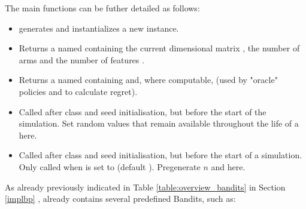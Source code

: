 \documentclass{jss}
\begin{document}
The main  functions can be futher detailed as follows:

\begin{itemize}
   \item{}{ generates and instantializes a new  instance. }

   \item{}{

      Returns a named 
      containing the current  dimensional matrix ,
      the number of arms  and the number of features .
  }

   \item{}{

      Returns a named  containing  and, where computable,
          (used by "oracle" policies and to calculate regret).
  }

   \item{}{
      Called after class and seed initialisation, but before the start of the simulation.
      Set random values that remain available throughout the life of a  here.
   }

   \item{}{
      Called after class and seed initialisation, but before the start of a simulation.
      Only called when  is set to  (default ).
      Pregenerate $n$  and  here.
   }
\end{itemize}

As already previously indicated in Table \ref{table:overview_bandits} in Section \ref{implbp} ,  already contains several predefined Bandits, such as:
\end{document}
